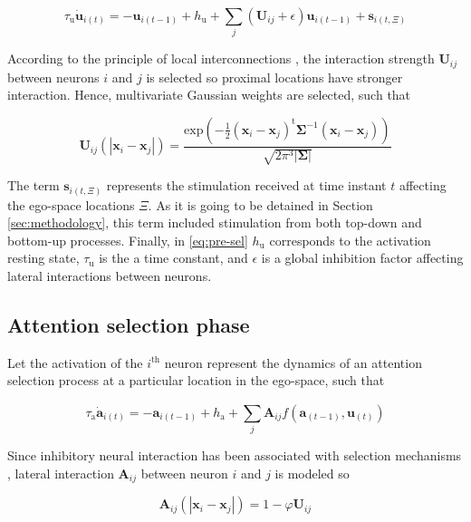 \documentclass[letterpaper, 10 pt, conference]{ieeeconf}  %
\begin{document}
	\begin{equation}
	\tau_\mathrm{u} \dot{\mathbf{u}}_{i(t)} = -\mathbf{u}_{i(t-1)} + h_\mathrm{u} + \sum_{j}^{} (\mathbf{U}_{ij}+\epsilon)\mathbf{u}_{i(t-1)} + \mathbf{s}_{i(t,\Xi)} 
	\label{eq:pre-sel}
	\end{equation}

	According to the principle of local interconnections \cite{samsonovich97}, the interaction strength $\mathbf{U}_{ij}$ between neurons $i$ and $j$ is selected so proximal locations have stronger interaction. Hence, multivariate Gaussian weights are selected, such that
	
	\begin{equation}
		\mathbf{U}_{ij}(|\mathbf{x}_i-\mathbf{x}_j|) = \frac{\mathrm{exp}\left(-\frac{1}{2} (\mathbf{x}_i-\mathbf{x}_j)^{\mathrm{t}}\mathbf{\Sigma}^{-1}(\mathbf{x}_i-\mathbf{x}_j)\right)}{\sqrt{2\pi^{3}|\mathbf{\Sigma}|}}	
	\label{eq:pre-sel-syn}
	\end{equation}
	
	The term $\mathbf{s}_{i(t,\Xi)}$ represents the stimulation received at time instant $t$ affecting the ego-space locations $\Xi$. As it is going to be detained in Section \ref{sec:methodology}, this term included stimulation from both top-down and bottom-up processes. Finally, in \eqref{eq:pre-sel} $h_\mathrm{u}$ corresponds to the activation resting state, $\tau_\mathrm{u}$ is the a time constant, and $\epsilon$ is a global inhibition factor affecting lateral interactions between neurons.
	 
	\subsection{Attention selection phase}
	
	Let the activation of the $i^\mathrm{th}$ neuron represent the dynamics of an attention selection process at a particular location in the ego-space, such that 
	
	\begin{equation}
	\tau_\mathrm{a} \dot{\mathbf{a}}_{i(t)} = -\mathbf{a}_{i(t-1)} + h_\mathrm{a} + \sum_{j}^{} \mathbf{A}_{ij}f\left(\mathbf{a}_{(t-1)}, \mathbf{u}_{(t)}\right) 
	\label{eq:sel}
	\end{equation}
	
	\noindent Since inhibitory neural interaction has been associated with selection mechanisms \cite{schoner2016}, lateral interaction $\mathbf{A}_{ij}$ between neuron $i$ and $j$ is modeled so

	\begin{equation}
	\mathbf{A}_{ij}(|\mathbf{x}_i-\mathbf{x}_j|) = 1 - \varphi\mathbf{U}_{ij}	
	\label{eq:sel-syn}
	\end{equation}
	
\end{document}
